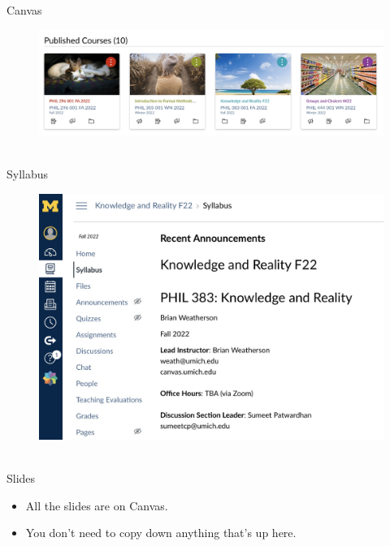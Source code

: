 \documentclass[
  17pt,
  letterpaper,
  ignorenonframetext,
  aspectratio=169,
  handout]{beamer}
\providecommand{\tightlist}{%
  \setlength{\itemsep}{0pt}\setlength{\parskip}{0pt}}\usepackage{longtable,booktabs,array}
\begin{document}
\begin{frame}{Canvas}
\protect\hypertarget{canvas}{}
\begin{figure}

{\centering \includegraphics[width=\textwidth,height=0.6\textheight]{../images/canvas.jpeg}

}

\caption{~}

\end{figure}
\end{frame}

\begin{frame}{Syllabus}
\protect\hypertarget{syllabus}{}
\begin{figure}

{\centering \includegraphics[width=\textwidth,height=0.6\textheight]{../images/syllabus.jpeg}

}

\caption{~}

\end{figure}
\end{frame}

\begin{frame}{Slides}
\protect\hypertarget{slides}{}
\begin{itemize}[<+->]
\tightlist
\item
  All the slides are on Canvas.
\item
  You don't need to copy down anything that's up here.
\end{itemize}
\end{frame}
\end{document}
